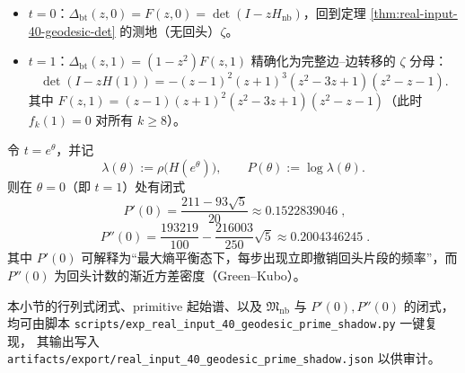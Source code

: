 \begin{remark}\label{rem:real-input-40-bartholdi-specializations}
\begin{itemize}
  \item \textbf{\(t=0\)}：\(\Delta_{\mathrm{bt}}(z,0)=F(z,0)=\det(I-zH_{\mathrm{nb}})\)，回到定理 \ref{thm:real-input-40-geodesic-det} 的测地（无回头）\(\zeta\)。
  \item \textbf{\(t=1\)}：\(\Delta_{\mathrm{bt}}(z,1)=(1-z^2)F(z,1)\) 精确化为完整边--边转移的 \(\zeta\) 分母：
  \[
  \det(I-zH(1))
  =-(z-1)^2(z+1)^3(z^2-3z+1)(z^2-z-1).
  \]
  其中 \(F(z,1)=(z-1)(z+1)^2(z^2-3z+1)(z^2-z-1)\)（此时 \(f_k(1)=0\) 对所有 \(k\ge 8\)）。
\end{itemize}
\end{remark}

\begin{theorem}[回头密度与回头方差的闭式]\label{thm:real-input-40-backtracking-cumulants}
令 \(t=e^{\theta}\)，并记
\[
\lambda(\theta):=\rho\!\bigl(H(e^{\theta})\bigr),\qquad
P(\theta):=\log\lambda(\theta).
\]
则在 \(\theta=0\)（即 \(t=1\)）处有闭式
\[
\boxed{\;
P'(0)=\frac{211-93\sqrt5}{20}\approx 0.1522839046\;},
\]
\[
\boxed{\;
P''(0)=\frac{193219}{100}-\frac{216003}{250}\sqrt5\approx 0.2004346245\; }.
\]
其中 \(P'(0)\) 可解释为“最大熵平衡态下，每步出现立即撤销回头片段的频率”，而 \(P''(0)\) 为回头计数的渐近方差密度（Green--Kubo）。
\end{theorem}

\begin{remark}[可复现计算链]\label{rem:real-input-40-geodesic-repro}
本小节的行列式闭式、primitive 起始谱、以及 \(\mathfrak{M}_{\mathrm{nb}}\) 与 \(P'(0),P''(0)\) 的闭式，
均可由脚本 \texttt{scripts/exp\_real\_input\_40\_geodesic\_prime\_shadow.py} 一键复现，
其输出写入 \texttt{artifacts/export/real\_input\_40\_geodesic\_prime\_shadow.json} 以供审计。
\end{remark}

